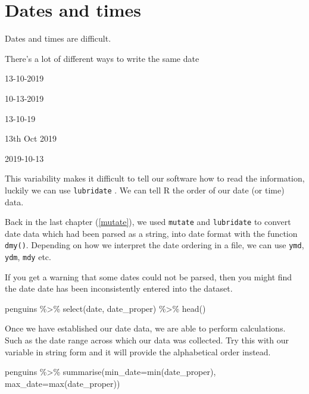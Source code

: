\documentclass[
]{book}
\newenvironment{Shaded}{\begin{snugshade}}{\end{snugshade}}
\newcommand{\AttributeTok}[1]{\textcolor[rgb]{0.77,0.63,0.00}{#1}}
\newcommand{\FunctionTok}[1]{\textcolor[rgb]{0.00,0.00,0.00}{#1}}
\newcommand{\NormalTok}[1]{#1}
\newcommand{\SpecialCharTok}[1]{\textcolor[rgb]{0.00,0.00,0.00}{#1}}
\begin{document}
\hypertarget{dates-and-times}{%
\section{Dates and times}\label{dates-and-times}}

Dates and times are difficult.

There's a lot of different ways to write the same date

13-10-2019

10-13-2019

13-10-19

13th Oct 2019

2019-10-13

This variability makes it difficult to tell our software how to read the information, luckily we can use \texttt{lubridate} \citet{R-lubridate}. We can tell R the order of our date (or time) data.

Back in the last chapter (\ref{mutate}), we used \texttt{mutate} and \texttt{lubridate} to convert date data which had been parsed as a string, into date format with the function \texttt{dmy()}. Depending on how we interpret the date ordering in a file, we can use \texttt{ymd}, \texttt{ydm}, \texttt{mdy} etc.

If you get a warning that some dates could not be parsed, then you might find the date date has been inconsistently entered into the dataset.

\begin{Shaded}
\begin{Highlighting}[]
\NormalTok{penguins }\SpecialCharTok{\%\textgreater{}\%} 
  \FunctionTok{select}\NormalTok{(date, date\_proper) }\SpecialCharTok{\%\textgreater{}\%} 
  \FunctionTok{head}\NormalTok{()}
\end{Highlighting}
\end{Shaded}

Once we have established our date data, we are able to perform calculations. Such as the date range across which our data was collected. Try this with our variable in string form and it will provide the alphabetical order instead.

\begin{Shaded}
\begin{Highlighting}[]
\NormalTok{penguins }\SpecialCharTok{\%\textgreater{}\%} 
  \FunctionTok{summarise}\NormalTok{(}\AttributeTok{min\_date=}\FunctionTok{min}\NormalTok{(date\_proper),}
            \AttributeTok{max\_date=}\FunctionTok{max}\NormalTok{(date\_proper))}
\end{Highlighting}
\end{Shaded}
\end{document}
